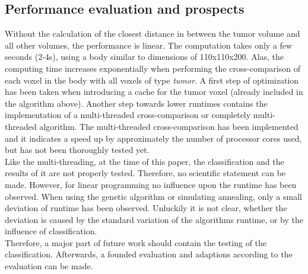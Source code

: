 \subsection{Performance evaluation and prospects}
Without the calculation of the closest distance in between the tumor volume and all other volumes, the performance is linear. The computation takes only a few seconds (2-4s), using a body similar to dimensions of 110x110x200. Alas, the computing time increases exponentially when performing the cross-comparison of each voxel in the body with all voxels of type \textit{tumor}. A first step of optimization has been taken when introducing a cache for the tumor voxel (already included in the algorithm above). Another step towards lower runtimes contains the implementation of a multi-threaded cross-comparison or completely multi-threaded algorithm. The multi-threaded cross-comparison has been implemented and it indicates a speed up by approximately the number of processor cores used, but has not been thoroughly tested yet. \\
Like the multi-threading, at the time of this paper, the classification and the results of it are not properly tested. Therefore, no scientific statement can be made. However, for linear programming no influence upon the runtime has been observed. When using the genetic algorithm or simulating annealing, only a small deviation of runtime has been observed. Unluckily it is not clear, whether the deviation is caused by the standard variation of the algorithms runtime, or by the influence of classification.\\
Therefore, a major part of future work should contain the testing of the classification. Afterwards, a founded evaluation and adaptions according to the evaluation can be made.